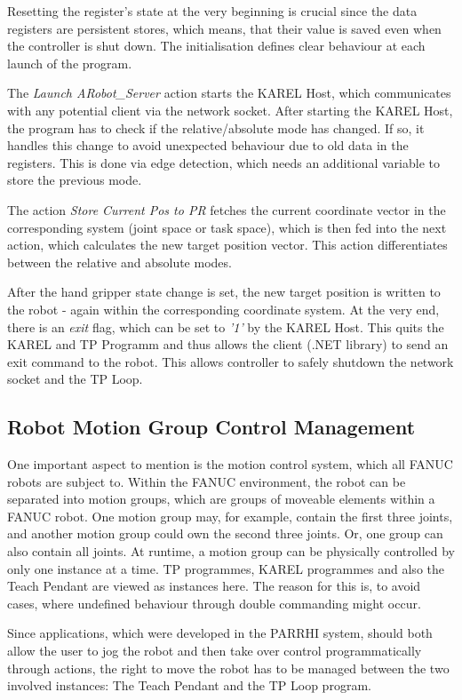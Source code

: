 Resetting the register's state at the very beginning is crucial since the data registers are persistent stores, which means, that their value is saved even when the controller is shut down. The initialisation defines clear behaviour at each launch of the program.

The \textit{Launch ARobot\_Server} action starts the KAREL Host, which communicates with any potential client via the network socket. After starting the KAREL Host, the program has to check if the relative/absolute mode has changed. If so, it handles this change to avoid unexpected behaviour due to old data in the registers. This is done via edge detection, which needs an additional variable to store the previous mode. 

The action \textit{Store Current Pos to PR} fetches the current coordinate vector in the corresponding system (joint space or task space), which is then fed into the next action, which calculates the new target position vector. This action differentiates between the relative and absolute modes. 

After the hand gripper state change is set, the new target position is written to the robot - again within the corresponding coordinate system. At the very end, there is an \textit{exit} flag, which can be set to \textit{'1'} by the KAREL Host. This quits the KAREL and TP Programm and thus allows the client (.NET library) to send an exit command to the robot. This allows controller to safely shutdown the network socket and the TP Loop. 

\subsection{Robot Motion Group Control Management}

One important aspect to mention is the motion control system, which all FANUC robots are subject to. Within the FANUC environment, the robot can be separated into motion groups, which are groups of moveable elements within a FANUC robot. One motion group may, for example, contain the first three joints, and another motion group could own the second three joints. Or, one group can also contain all joints. At runtime, a motion group can be physically controlled by only one instance at a time. TP programmes, KAREL programmes and also the Teach Pendant are viewed as instances here. The reason for this is, to avoid cases, where undefined behaviour through double commanding might occur. 

Since applications, which were developed in the PARRHI system, should both allow the user to jog the robot and then take over control programmatically through actions, the right to move the robot has to be managed between the two involved instances: The Teach Pendant and the TP Loop program.

